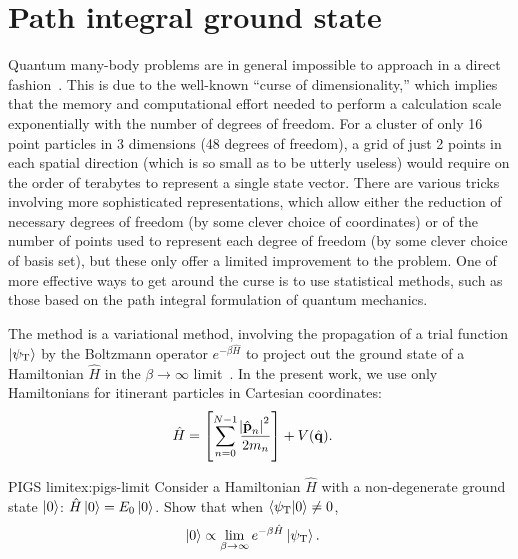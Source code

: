 \section{Path integral ground state}

Quantum many-body problems are in general impossible to approach in a direct fashion~\cite[391-392]{tuckerman2010statistical}.
This is due to the well-known ``curse of dimensionality,'' which implies that the memory and computational effort needed to perform a calculation scale exponentially with the number of degrees of freedom.
For a cluster of only 16 point particles in 3 dimensions (48 degrees of freedom), a grid of just 2 points in each spatial direction (which is so small as to be utterly useless) would require on the order of terabytes to represent a single state vector.
There are various tricks involving more sophisticated representations, which allow either the reduction of necessary degrees of freedom (by some clever choice of coordinates) or of the number of points used to represent each degree of freedom (by some clever choice of basis set), but these only offer a limited improvement to the problem.
One of more effective ways to get around the curse is to use statistical methods, such as those based on the path integral formulation of quantum mechanics.

The  method is a variational method, involving the propagation of a trial function $\ket{\psi_\mathrm{T}}$ by the Boltzmann operator $e^{-\beta \hat{H}}$ to project out the ground state of a Hamiltonian $\hat{H}$ in the $\beta \to \infty$ limit~\cite{sarsa2000pigs}.
In the present work, we use only Hamiltonians for itinerant particles in Cartesian coordinates:
\begin{align}
	\hat{H}
	&= \left[ \sum_{n=0}^{N-1} \frac{\abs{\hat{\bm{\mathbf{p}}}_n}^2}{2 m_n} \right]
		+ V(\hat{\bm{\mathbf{q}}}).
\end{align}

\begin{DefExercise}{PIGS limit}{ex:pigs-limit}
	Consider a Hamiltonian $\hat{H}$ with a non-degenerate ground state $\ket{0}$: $\hat{H} \ket{0} = E_0 \ket{0}$.
	Show that when $\braket{\psi_\mathrm{T} | 0} \ne 0$,
	\begin{align}
		\ket{0}
		&\propto \lim_{\beta \to \infty} e^{-\beta \hat{H}} \ket{\psi_\mathrm{T}}.
	\end{align}
\end{DefExercise}

